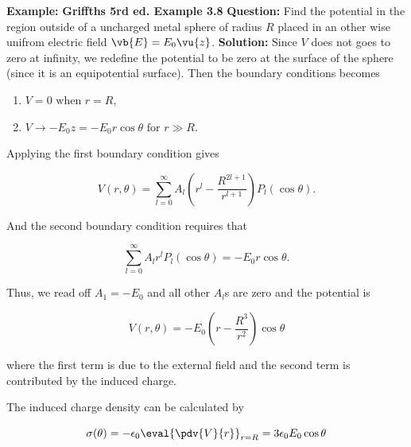 \documentclass[a4paper,12pt]{report}
\begin{document}
	\begin{example_template}
		\textbf{Example:} \textbf{Griffths 5rd ed. Example 3.8} \newline \newline
		\textbf{Question:} Find the potential in the region outside of a uncharged metal sphere of radius \(R\) placed in an other wise unifrom electric field \(\vb{E} = E_0 \vu{z} \).   \newline \newline
		\textbf{Solution:}  Since \(V\) does not goes to zero at infinity, we redefine the potential to be zero at the surface of the sphere (since it is an equipotential surface). Then the boundary conditions becomes
		
		\begin{enumerate}
			\item \(V = 0 \text { when } r = R\),
			\item \(V \rightarrow -E_0z = -E_0r\cos \theta \text { for } r \gg R.\) 
		\end{enumerate}
		
		Applying the first boundary condition gives
		
		\begin{equation}
			V(r,\theta ) = \sum_{l=0}^{\infty} A_{l} (r^{l}  - \frac{R^{2l+1} }{r^{l+1} } ) P_{l} (\cos \theta ). 			
		\end{equation}
		
		And the second boundary condition requires that 
		
		\begin{equation}
			\sum_{l=0}^{\infty} A_{l} r^{l} P_{l} (\cos \theta ) = -E_0 r\cos \theta .  
		\end{equation}
		
		Thus, we read off \(A_1 = -E_0\) and all other \(A_{l}\)s are zero and the potential is 
		
		\begin{equation}
			V(r,\theta ) = -E_0 (r-\frac{R^3}{r^2} ) \cos \theta 
		\end{equation}
		
		where the first term is due to the external field and the second term is contributed by the induced charge.
		
		The induced charge density can be calculated by 
		
		\begin{equation}
			\sigma (\theta ) = -\epsilon_0 \eval{\pdv{V}{r} }_{r=R}^{} = 3 \epsilon_0	E_0 \cos \theta  
		\end{equation}
		
	\end{example_template}
	
\end{document}
